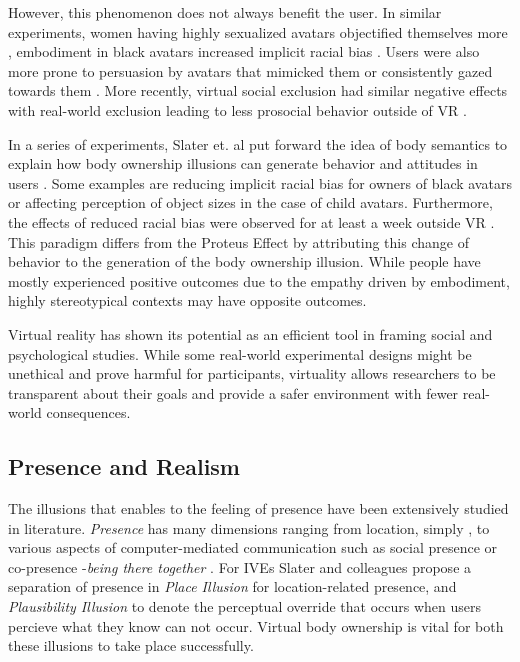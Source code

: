 However, this phenomenon does not always benefit the user. In similar experiments, women having highly sexualized avatars objectified themselves more \cite{fox2013embodiment}, embodiment in black avatars increased implicit racial bias \cite{groom2009influence}. Users were also more prone to persuasion by avatars that mimicked them  or consistently gazed towards them \cite{bailenson2005digital}. 
More recently, virtual social exclusion had similar negative effects with real-world exclusion leading to less prosocial behavior outside of VR \cite{kothgassner2017real}.

In a series of experiments, Slater et. al put forward the idea of body semantics to explain how body ownership illusions can generate behavior and attitudes in users \cite{slater2014transcending}. Some examples are reducing implicit racial bias for owners of black avatars or affecting perception of object sizes in the case of child avatars. Furthermore, the effects of reduced racial bias were observed for at least a week outside VR \cite{banakou2016virtual}. 
This paradigm differs from the Proteus Effect by attributing this change of behavior to the generation of the body ownership illusion. While people have mostly experienced positive outcomes due to the empathy driven by embodiment, highly stereotypical contexts may have opposite outcomes.


Virtual reality has shown its potential as an efficient tool in framing social and psychological studies. 
While some real-world experimental designs might be unethical and prove harmful for participants, virtuality allows researchers to be transparent about their goals and provide a safer environment with fewer real-world consequences.

\subsection{Presence and Realism}



The illusions that enables to the feeling of presence have been extensively studied in literature. 
\textit{Presence} has many dimensions ranging from location, simply , to various aspects of computer-mediated communication such as social presence or co-presence -\textit{being there together} \cite{zhao2003toward}.
For IVEs Slater and colleagues propose a separation of presence in \textit{Place Illusion} for location-related presence, and \textit{Plausibility Illusion} to denote the perceptual override that occurs when users percieve what they know can not occur.
Virtual body ownership is vital for both these illusions to take place successfully. 

